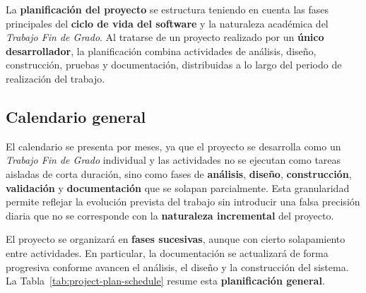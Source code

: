 La \textbf{planificación del proyecto} se estructura teniendo en cuenta las fases principales del \textbf{ciclo de vida del software} y la naturaleza académica del \textit{Trabajo Fin de Grado}. Al tratarse de un proyecto realizado por un \textbf{único desarrollador}, la planificación combina actividades de análisis, diseño, construcción, pruebas y documentación, distribuidas a lo largo del periodo de realización del trabajo.

\subsection{Calendario general}

El calendario se presenta por meses, ya que el proyecto se desarrolla como un \textit{Trabajo Fin de Grado} individual y las actividades no se ejecutan como tareas aisladas de corta duración, sino como fases de \textbf{análisis}, \textbf{diseño}, \textbf{construcción}, \textbf{validación} y \textbf{documentación} que se solapan parcialmente. Esta granularidad permite reflejar la evolución prevista del trabajo sin introducir una falsa precisión diaria que no se corresponde con la \textbf{naturaleza incremental} del proyecto.

El proyecto se organizará en \textbf{fases sucesivas}, aunque con cierto solapamiento entre actividades. En particular, la documentación se actualizará de forma progresiva conforme avancen el análisis, el diseño y la construcción del sistema. La Tabla~\ref{tab:project-plan-schedule} resume esta \textbf{planificación general}.

